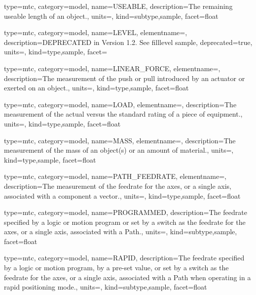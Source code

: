 {
  type=mtc,
  category=model,
  name={USEABLE},
  description={The remaining useable length of an object.},
  units=,
  kind={subtype,sample},
  facet={\gls{float}}
}


{
  type=mtc,
  category=model,
  name={LEVEL},
  elementname=,
  description={DEPRECATED in Version 1.2.  See \gls{filllevel sample}},
  deprecated={true},
  units={},
  kind={type,sample},
  facet={}
}


{
  type=mtc,
  category=model,
  name={LINEAR\_FORCE},
  elementname=,
  description={The measurement of the push or pull introduced by an actuator or exerted on an object.},
  units=,
  kind={type,sample},
  facet={\gls{float}}
}


{
  type=mtc,
  category=model,
  name={LOAD},
  elementname=,
  description={The measurement of the actual versus the standard rating of a piece of equipment.},
  units=,
  kind={type,sample},
  facet={\gls{float}}
}


{
  type=mtc,
  category=model,
  name={MASS},
  elementname=,
  description={The measurement of the mass of an object(s) or an amount of material.},
  units=,
  kind={type,sample},
  facet={\gls{float}}
}


{
  type=mtc,
  category=model,
  name={PATH\_FEEDRATE},
  elementname=,
  description={The measurement of the feedrate for the axes, or a single axis, associated with a  component a vector.},
  units=,
  kind={type,sample},
  facet={\gls{float}}
}




{
  type=mtc,
  category=model,
  name={PROGRAMMED},
  description={The feedrate specified by a logic or motion program or set by a switch as the feedrate for the axes, or a single axis, associated with a Path.},
  units=,
  kind={subtype,sample},
  facet={\gls{float}}
}


{
  type=mtc,
  category=model,
  name={RAPID},
  description={The feedrate specified by a logic or motion program, by a pre-set value, or set by a switch as the feedrate for the axes, or a single axis, associated with a Path when operating in a rapid positioning mode.},
  units=,
  kind={subtype,sample},
  facet={\gls{float}}
}


